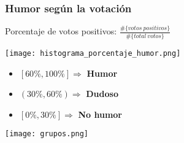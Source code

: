 \begin{frame}[allowframebreaks]
    \frametitle{Humor según la votación}

    Porcentaje de votos positivos: $\frac{\#\{votos\ positivos\}}{\#\{total\ votos\}}$

    \begin{center}
        \texttt{[image: histograma\_porcentaje\_humor.png]}
    \end{center}

    \begin{itemize}
        \item $[60\%, 100\%] \Rightarrow$ \textbf{Humor}
        \item $(30\%, 60\%) \Rightarrow$ \textbf{Dudoso}
        \item $[0\%, 30\%] \Rightarrow$ \textbf{No humor}
    \end{itemize}

    \framebreak

    \begin{center}
        \texttt{[image: grupos.png]}
    \end{center}
\end{frame}
